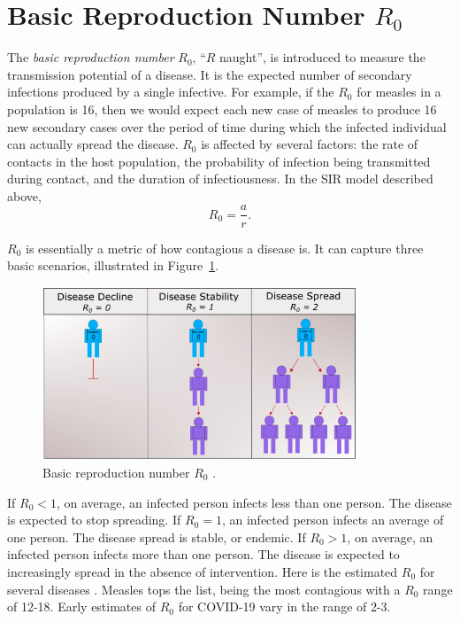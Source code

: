 \documentclass[10pt,letterpaper]{article}
\begin{document}
\section*{Basic Reproduction Number $R_0$}
The {\it  basic reproduction number\/} $R_0$, ``$R$ naught'', is introduced to measure the transmission potential of a disease. It is the expected number of secondary infections produced by a single infective. For example, if the $R_0$ for measles in a population is 16, then we would expect each new case of measles to produce 16 new secondary cases over the period of time during which the infected individual can actually spread the disease. $R_0$ is affected by several factors: the rate of contacts in the host population, the probability of infection being transmitted during contact, and the duration of infectiousness. In the SIR model described above, 
\begin{equation}
R_0=\frac{a}{r}.
\end{equation}

$R_0$ is essentially a metric of how contagious a disease is. It can capture three basic scenarios, illustrated in Figure~\ref{fig:R0}.
\begin{figure}[htb]
\includegraphics[width=3.7in]{R0}
\centering
\caption{\label{fig:R0}Basic reproduction number $R_0$ \cite{COVID2020}.}
\end{figure}

If $R_0 < 1$, on average, an infected person infects less than one person. The disease is expected to stop spreading. If $R_0 = 1$, an infected person infects an average of one person.
The disease spread is stable, or endemic. If $R_0 > 1$, on average, an infected person infects more than one person. The disease is expected to increasingly spread in the absence of intervention. Here is the estimated $R_0$ for several diseases \cite{Pandemic2020}. Measles tops the list, being the most contagious with a $R_0$ range of 12-18. Early estimates of $R_0$ for COVID-19 vary in the range of 2-3. \bigskip
\end{document}

